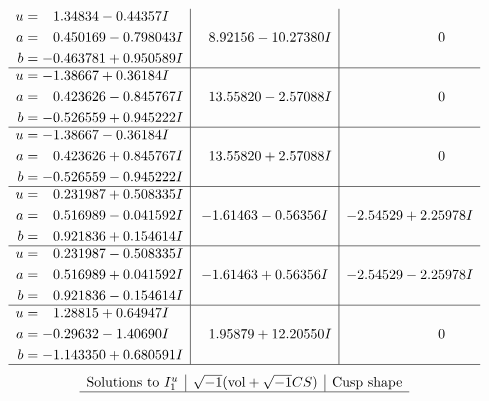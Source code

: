 \documentclass[1p]{elsarticle_modified}
\theoremstyle{definition}
\newcommand{\I}{\sqrt{-1}}
\begin{document}
$$\begin{array}{c|c|c}
\begin{aligned}
u &= \phantom{-}1.34834 - 0.44357 I \\
a &= \phantom{-}0.450169 - 0.798043 I \\
b &= -0.463781 + 0.950589 I\end{aligned}
 & \phantom{-}8.92156 - 10.27380 I & \phantom{-0.000000 } 0 \\ \hline\begin{aligned}
u &= -1.38667 + 0.36184 I \\
a &= \phantom{-}0.423626 - 0.845767 I \\
b &= -0.526559 + 0.945222 I\end{aligned}
 & \phantom{-}13.55820 - 2.57088 I & \phantom{-0.000000 } 0 \\ \hline\begin{aligned}
u &= -1.38667 - 0.36184 I \\
a &= \phantom{-}0.423626 + 0.845767 I \\
b &= -0.526559 - 0.945222 I\end{aligned}
 & \phantom{-}13.55820 + 2.57088 I & \phantom{-0.000000 } 0 \\ \hline\begin{aligned}
u &= \phantom{-}0.231987 + 0.508335 I \\
a &= \phantom{-}0.516989 - 0.041592 I \\
b &= \phantom{-}0.921836 + 0.154614 I\end{aligned}
 & -1.61463 - 0.56356 I & -2.54529 + 2.25978 I \\ \hline\begin{aligned}
u &= \phantom{-}0.231987 - 0.508335 I \\
a &= \phantom{-}0.516989 + 0.041592 I \\
b &= \phantom{-}0.921836 - 0.154614 I\end{aligned}
 & -1.61463 + 0.56356 I & -2.54529 - 2.25978 I \\ \hline\begin{aligned}
u &= \phantom{-}1.28815 + 0.64947 I \\
a &= -0.29632 - 1.40690 I \\
b &= -1.143350 + 0.680591 I\end{aligned}
 & \phantom{-}1.95879 + 12.20550 I & \phantom{-0.000000 } 0\\
 \hline 
 \end{array}$$\newpage$$\begin{array}{c|c|c}  
\text{Solutions to }I^u_{1}& \I (\text{vol} + \sqrt{-1}CS) & \text{Cusp shape}\\
 \hline 

\end{array}$$
\end{document}
